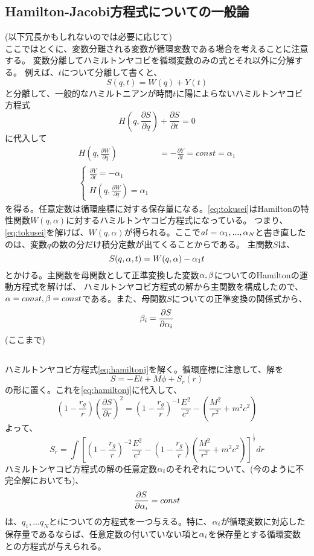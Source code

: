 \documentclass{jsarticle}
\newcommand{\pder}[2][]{\frac{\partial#1}{\partial#2}}
\newcommand{\half}{\frac{1}{2}}
\newcommand{\beq}{\begin{equation}}
\newcommand{\eeq}{\end{equation}}
\begin{document}
\subsection{Hamilton-Jacobi方程式についての一般論}
(以下冗長かもしれないのでは必要に応じて)\\
ここではとくに、変数分離される変数が循環変数である場合を考えることに注意する。
変数分離してハミルトンヤコビを循環変数のみの式とそれ以外に分解する。
例えば、$t$について分離して書くと、
\beq
S(q, t) = W(q) + Y(t)
\eeq
と分離して、一般的なハミルトニアンが時間$t$に陽によらないハミルトンヤコビ方程式
\beq
    H(q,\pder[S]{q}) + \pder[S]{t} = 0
\eeq
に代入して
\begin{align}
    H(q, \pder[W]{q}) &= - \pder[Y]{t} = const =\alpha_1\\
    \left\{
\begin{array}{l}
    \pder[Y]{t} = -\alpha_1\\
    H(q, \pder[W]{q}) = \alpha_1\label{eq:tokusei}
\end{array}
\right.
\end{align}
を得る。任意定数は循環座標に対する保存量になる。\eqref{eq:tokusei}はHamiltonの特性関数$W(q,\alpha)$に対するハミルトンヤコビ方程式になっている。
つまり、\eqref{eq:tokusei}を解けば、$W(q,\alpha)$が得られる。ここで$al = {\alpha_1, ... ,\alpha_N}$と書き直したのは、変数$q$の数の分だけ積分定数が出てくることからである。
主関数$S$は、
\beq
S(q, \alpha, t) = W(q, \al) - \al_1 t
\eeq
とかける。主関数を母関数として正準変換した変数$\alpha, \beta$についてのHamiltonの運動方程式を解けば、
ハミルトンヤコビ方程式の解から主関数を構成したので、$\alpha = const, \beta = const$である。また、母関数$S$についての正準変換の関係式から、
\beq
 \be_i = \pder[S]{\al_i}
\eeq
(ここまで)
\subsection{}
ハミルトンヤコビ方程式\eqref{eq:hamiltonj}を解く。循環座標に注意して、解を
\beq
    S = - Et + M \phi + S_r(r)
\eeq
の形に置く。これを\eqref{eq:hamiltonj}に代入して、
\beq
    (1 - \frac{r_g}{r})(\pder[S]{r})^2 = (1 - \frac{r_g}{r})^{-1} \frac{E^2}{c^2} - (\frac{M^2}{r^2} + m^2c^2)
\eeq
よって、
\beq
S_r = \int \left[(1 - \frac{r_g}{r})^{-2} \frac{E^2}{c^2} - (1 - \frac{r_g}{r})(\frac{M^2}{r^2} + m^2c^2)
 \right]^{\half}dr
\eeq
ハミルトンヤコビ方程式の解の任意定数$\alpha_i$のそれぞれについて、(今のように不完全解においても)、
\beq
    \pder[S]{\al_i} = const
\eeq
は、$q_1, ... q_N$と$t$についての方程式を一つ与える。特に、$\alpha_i$が循環変数に対応した保存量であるならば、任意定数の付いていない項と$\alpha_i$を保存量とする循環変数との方程式が与えられる。\\
\end{document}
